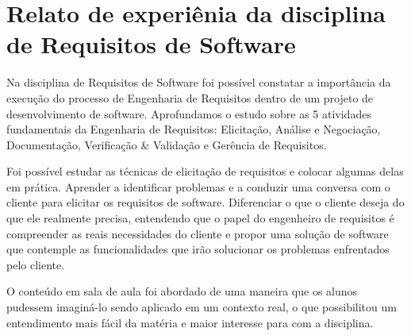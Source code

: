 \section{Relato de experiênia da disciplina de Requisitos de Software}
	Na disciplina de Requisitos de Software foi possível constatar a importância da execução do processo de Engenharia de Requisitos dentro de um projeto de desenvolvimento de software. Aprofundamos o estudo sobre as 5 atividades fundamentais da Engenharia de Requisitos: Elicitação, Análise e Negociação, Documentação, Verificação \& Validação e Gerência de Requisitos.

	Foi possível estudar as técnicas de elicitação de requisitos e colocar algumas delas em prática. Aprender a identificar problemas e a conduzir uma conversa com o cliente para elicitar os requisitos de software. Diferenciar o que o cliente deseja do que ele realmente precisa, entendendo que o papel do engenheiro de requisitos é compreender as reais necessidades do cliente e propor uma solução de software que contemple as funcionalidades que irão solucionar os problemas enfrentados pelo cliente.

	O conteúdo em sala de aula foi abordado de uma maneira que os alunos pudessem imaginá-lo sendo aplicado em um contexto real, o que possibilitou um entendimento mais fácil da matéria e maior interesse para com a disciplina.